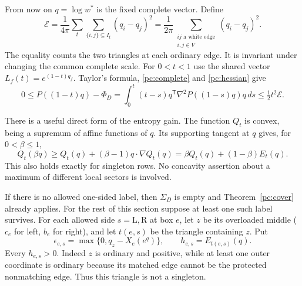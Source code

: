 \documentclass[11pt]{article}
\numberwithin{equation}{section}
\theoremstyle{definition}\newtheorem{definition}[theorem]{Definition}
\theoremstyle{remark}\newtheorem{remark}[theorem]{Remark}
\newcommand{\Lft}{\mathrm L}
\newcommand{\Rgt}{\mathrm R}
\begin{document}
From now on \(q=\log w^*\) is the fixed complete vector. Define
\begin{equation}\label{pc:energy}
 \mathcal E=\frac1{4\pi}
       \sum_t\sum_{\{i,j\}\subseteq I_t}(q_i-q_j)^2
   =\frac1{2\pi}\sum_{\substack{ij\text{ a white edge}\\i,j\in V}}
                                      (q_i-q_j)^2 .
\end{equation}
The equality counts the two triangles at each ordinary edge.
It is invariant under changing the common complete scale.
For \(0<t<1\) use the shared vector \(L_f(t)=e^{(1-t)q_f}\).
Taylor's formula, \eqref{pc:complete} and \eqref{pc:hessian} give
\begin{equation}\label{pc:cost}
 0\le P((1-t)q)-\Phi_D
   =\int_0^t(t-s)q^{\mathsf T}\nabla^2P((1-s)q)q\,ds
   \le\tfrac12t^2\mathcal E.
\end{equation}

There is a useful direct form of the entropy gain. The function
\(Q_t\) is convex, being a supremum of affine functions of \(q\).
Its supporting tangent at \(q\) gives, for \(0<\beta\le1\),
\begin{equation}\label{pc:tangent}
 Q_t(\beta q)\ge Q_t(q)+(\beta-1)q\cdot\nabla Q_t(q)
                =\beta Q_t(q)+(1-\beta)E_t(q).
\end{equation}
This also holds exactly for singleton rows. No concavity assertion
about a maximum of different local sectors is involved.

If there is no allowed one-sided label, then \(\Sigma_D\) is empty
and Theorem~\ref{pc:cover} already applies. For the rest of this
section suppose at least one such label survives.
For each allowed side \(s=\Lft,\Rgt\) at box \(e\), let \(z\)
be its overloaded middle (\(c_e\) for left, \(b_e\) for right),
and let \(t(e,s)\) be the triangle containing \(z\). Put
\begin{equation}\label{pc:defects}
 \epsilon_{e,s}=\max\{0,q_z-X_e(e^q)\},\qquad
                     h_{e,s}=E_{t(e,s)}(q).
\end{equation}
Every \(h_{e,s}>0\). Indeed \(z\) is ordinary and positive, while
at least one outer coordinate is ordinary because its matched edge
cannot be the protected nonmatching edge. Thus this triangle is
not a singleton.
\end{document}
